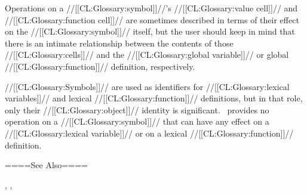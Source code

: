 Operations on a //[[CL:Glossary:symbol]]//'s //[[CL:Glossary:value cell]]// and //[[CL:Glossary:function cell]]// are sometimes described in terms of their effect on the //[[CL:Glossary:symbol]]// itself, but the user should keep in mind that there is an intimate relationship between the contents of those //[[CL:Glossary:cells]]// and the //[[CL:Glossary:global variable]]// or global //[[CL:Glossary:function]]// definition, respectively.

//[[CL:Glossary:Symbols]]// are used as identifiers for //[[CL:Glossary:lexical variables]]// and lexical //[[CL:Glossary:function]]// definitions, but in that role, only their //[[CL:Glossary:object]]// identity is significant. \clisp\ provides no operation on a //[[CL:Glossary:symbol]]// that can have any effect on a //[[CL:Glossary:lexical variable]]// or on a lexical //[[CL:Glossary:function]]// definition.

====See Also====

{\secref\SymbolTokens}, {\secref\PotentialNumbersAsTokens}, {\secref\PrintingSymbols}

  

